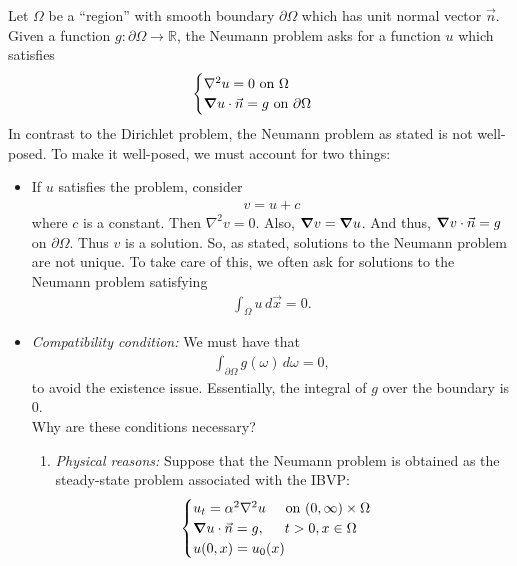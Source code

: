 \documentclass{article}
\theoremstyle{definition}
\newcommand{\p}{\partial}
\newcommand{\R}{\mathbb{R}}
\begin{document}
\begin{enumerate}
		Let $\Omega$ be a ``region'' with smooth boundary $\p \Omega$ which has unit normal vector $\vec{n}$. Given a function $g : \p \Omega \to \R$, the Neumann problem asks for a function $u$ which satisfies
		\begin{align*}
		\begin{cases}
		 \nabla^2 u = 0 \text{ on } \Omega\\
		 \grad{u} \cdot \vec{n} = g \text{ on }\p\Omega
		\end{cases}
		\end{align*} 
		In contrast to the Dirichlet problem, the Neumann problem as stated is not well-posed. To make it well-posed, we must account for two things:
		\begin{itemize}
			\item If $u$ satisfies the problem, consider
			\begin{align*}
			v = u + c
			\end{align*}
			where $c$ is a constant. Then $\nabla^2 v = 0$. Also, $\grad{v} = \grad{u}$. And thus, $\grad{v}\cdot \vec{n} = g$ on $\p\Omega$. Thus $v$ is a solution. So, as stated, solutions to the Neumann problem are not unique. To take care of this, we often ask for solutions to the Neumann problem satisfying
			\begin{align*}
			\int_\Omega u\,d\vec{x} = 0.
			\end{align*}
			\item \textit{Compatibility condition:} We must have that 
			\begin{align*}
			\int_{\p\Omega} g(\omega)\,d\omega = 0,
			\end{align*}
			to avoid the existence issue. Essentially, the integral of $g$ over the boundary is 0. \\
			
			Why are these conditions necessary? 
			\begin{enumerate}
				\item \textit{Physical reasons:} Suppose that the Neumann problem is obtained as the steady-state problem associated with the IBVP:
				\begin{align*}
				\begin{cases}
				u_t = \alpha^2 \nabla^2 u \hspace{0.5cm} \text{on $(0,\infty)\times \Omega$}\\
				\grad{u}\cdot \vec{n} = g, \hspace{0.5cm} t>0, x\in \Omega \\
				u(0,x) = u_0(x)
				\end{cases}
				\end{align*}
				

\end{enumerate}
\end{itemize}
\end{enumerate}
\end{document}
